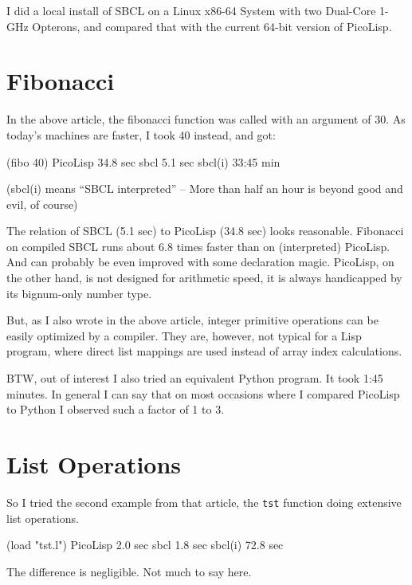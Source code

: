 I did a local install of SBCL on a Linux x86-64 System with two Dual-Core 1-GHz
Opterons, and compared that with the current 64-bit version of PicoLisp.

\section{Fibonacci}
\label{sec:need-speed-fibonacci}

In the above article, the fibonacci function was called with an argument of 30.
As today's machines are faster, I took 40 instead, and got:
\begin{wideverbatim}
   (fibo 40)
      PicoLisp    34.8 sec
      sbcl         5.1 sec
      sbcl(i)    33:45 min
\end{wideverbatim}

(sbcl(i) means ``SBCL interpreted'' -- More than half an hour is beyond good and
evil, of course)

The relation of SBCL (5.1 sec) to PicoLisp (34.8 sec) looks reasonable.
Fibonacci on compiled SBCL runs about 6.8 times faster than on (interpreted)
PicoLisp. And can probably be even improved with some declaration magic.
PicoLisp, on the other hand, is not designed for arithmetic speed, it is always
handicapped by its bignum-only number type.

But, as I also wrote in the above article, integer primitive operations can be
easily optimized by a compiler. They are, however, not typical for a Lisp
program, where direct list mappings are used instead of array index
calculations.

BTW, out of interest I also tried an equivalent Python program. It took 1:45
minutes. In general I can say that on most occasions where I compared PicoLisp
to Python I observed such a factor of 1 to 3.

\section{List Operations}
\label{sec:need-speed-list-operations}

So I tried the second example from that article, the \texttt{tst} function doing
extensive list operations.
\begin{wideverbatim}
   (load "tst.l")
      PicoLisp     2.0 sec
      sbcl         1.8 sec
      sbcl(i)     72.8 sec
\end{wideverbatim}

The difference is negligible. Not much to say here.

